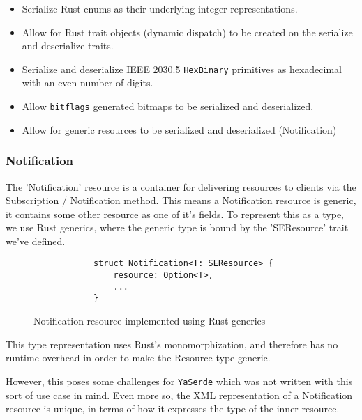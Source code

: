 \begin{itemize}
    \item Serialize Rust enums as their underlying integer representations.
    \item Allow for Rust trait objects (dynamic dispatch) to be created on the serialize and deserialize traits.
    \item Serialize and deserialize IEEE 2030.5 \texttt{HexBinary} primitives as hexadecimal with an even number of digits. 
    \item Allow \texttt{bitflags} generated bitmaps to be serialized and deserialized.
    \item Allow for generic resources to be serialized and deserialized (Notification)
\end{itemize}

\subsubsection{Notification}
The 'Notification' resource is a container for delivering resources to clients via the Subscription / Notification method. This means a Notification resource is generic, it contains some other resource as one of it's fields. To represent this as a type, we use Rust generics, where the generic type is bound by the 'SEResource' trait we've defined.

\begin{figure}[H]
    \begin{center}
        \begin{lstlisting}
            struct Notification<T: SEResource> {
                resource: Option<T>,
                ...
            }
        \end{lstlisting}
        \label{fig:notifgeneric}
        \caption{Notification resource implemented using Rust generics}
    \end{center}
\end{figure}

This type representation uses Rust's monomorphization, and therefore has no runtime overhead in order to make the Resource type generic.

However, this poses some challenges for \texttt{YaSerde} which was not written with this sort of use case in mind. Even more so, the XML representation of a Notification resource is unique, in terms of how it expresses the type of the inner resource.

